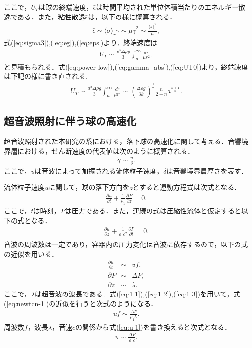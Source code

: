 ここで，$U_T$は球の終端速度，$\bar{\epsilon}$は時間平均された単位体積当たりのエネルギー散逸である．また，粘性散逸$\bar{\epsilon}$は，以下の様に概算される．
\begin{eqnarray}
    \bar{\epsilon} \sim \langle\sigma\rangle_r\dot{\gamma} \sim \mu \dot{\gamma}^2 \sim \frac{\langle\sigma\rangle_r^2}{\mu} ,
    \label{eq:eps}
\end{eqnarray}
式(\ref{eq:sigma3}),(\ref{eq:eg}),(\ref{eq:eps})より，終端速度は
\begin{eqnarray}
    U_T \sim \frac{a^3\Delta\rho g}{3}\int_a^\infty\frac{dr}{\mu r^2} ,
    \label{eq:UT0}
\end{eqnarray}
と見積もられる．式(\ref{eq:power-low}),(\ref{eq:gamma_abs}),(\ref{eq:UT0})より，終端速度は下記の様に書き直される.
\begin{eqnarray}
    U_T \sim \frac{a^3\Delta\rho g}{3}  \int^{\infty}_{a} \frac{dr}{\mu r^2} \sim \left(\frac{\Delta \rho g}{3k}\right)^{\frac{1}{n}}\frac{n}{2-n}a^{\frac{n+1}{n}} .
    \label{eq:UT}
\end{eqnarray}

\subsection{超音波照射に伴う球の高速化}
超音波照射された本研究の系における，落下球の高速化に関して考える．音響境界層における，せん断速度の代表値は次のように概算される．
\begin{eqnarray}
    \dot{\gamma} \sim \frac{u}{\delta} .
    \label{eq:abl-delta}
\end{eqnarray}
ここで，$u$は音波によって加振される流体粒子速度，$\delta$は音響境界層厚さを表す．

流体粒子速度$u$に関して，球の落下方向を$z$とすると運動方程式は次式となる．
\begin{eqnarray}
    \frac{\partial u}{\partial t} + \frac{1}{\rho_1}\frac{\partial P}{\partial z} = 0 .
    \label{eq:newton-1}
\end{eqnarray}
ここで，$t$は時刻，$P$は圧力である．また，連続の式は圧縮性流体と仮定すると以下の式となる．
\begin{eqnarray}
    \frac{\partial u}{\partial z} + \frac{1}{\rho_1 c^2}\frac{\partial P}{\partial t} = 0 .
\end{eqnarray}
音波の周波数は一定であり，容器内の圧力変化は音波に依存するので，以下の式の近似を用いる．
\begin{eqnarray}
    \frac{\partial u}{\partial t} &\sim& uf ,\label{eq:1-1}\\
    \partial P &\sim& \Delta P ,\label{eq:1-2}\\
    \partial z &\sim& \lambda .\label{eq:1-3}
\end{eqnarray}
ここで，$\lambda$は超音波の波長である．式(\ref{eq:1-1}),(\ref{eq:1-2}),(\ref{eq:1-3})を用いて，式(\ref{eq:newton-1})の近似を行うと次式のようになる．
\begin{eqnarray}
    uf \sim \frac{\Delta P}{\rho_1 \lambda} .
    \label{eq:u-1}
\end{eqnarray}
周波数$f$，波長$\lambda$，音速$c$の関係から式(\ref{eq:u-1})を書き換えると次式となる．
\begin{eqnarray}
    u \sim \frac{\Delta P}{\rho_1 c} .
\end{eqnarray}

